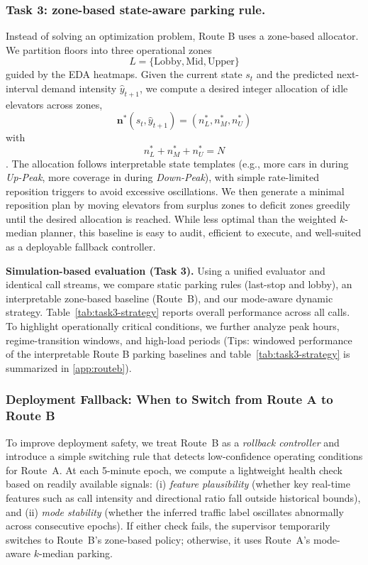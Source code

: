 \subsubsection{Task 3: zone-based state-aware parking rule.}\label{subsubsec:routebtask3}
Instead of solving an optimization problem, Route B uses a zone-based allocator. We partition floors into three operational zones
\[L=\{\text{Lobby},\text{Mid},\text{Upper}\}\] guided by the EDA heatmaps. Given the current state $s_t$ and the predicted next-interval
demand intensity $\hat y_{t+1}$, we compute a desired integer allocation of idle elevators across zones,
\[\mathbf{n}^{*}(s_t,\hat y_{t+1})=(n^{*}_{L},n^{*}_{M},n^{*}_{U})\] with \[n^{*}_{L}+n^{*}_{M}+n^{*}_{U}=N\]. The allocation follows
interpretable state templates (e.g., more cars in  during \emph{Up-Peak}, more coverage in  during \emph{Down-Peak}),
with simple rate-limited reposition triggers to avoid excessive oscillations. We then generate a minimal reposition plan by moving elevators
from surplus zones to deficit zones greedily until the desired allocation is reached. While less optimal than the weighted $k$-median planner,
this baseline is easy to audit, efficient to execute, and well-suited as a deployable fallback controller.


\noindent\textbf{Simulation-based evaluation (Task 3).}
Using a unified evaluator and identical call streams, we compare static parking rules
(last-stop and lobby), an interpretable zone-based baseline (Route~B),
and our mode-aware dynamic strategy.
Table~\ref{tab:task3-strategy} reports overall performance across all calls.
To highlight operationally critical conditions, we further analyze peak hours,
regime-transition windows, and high-load periods (Tips: windowed performance of the interpretable Route B parking baselines and table~\ref{tab:task3-strategy} is summarized in \ref{app:routeb}).

\subsubsection{Deployment Fallback: When to Switch from Route A to Route B}\label{subsubsec:switching}

To improve deployment safety, we treat Route~B as a \emph{rollback controller} and introduce a simple switching rule that detects
low-confidence operating conditions for Route~A. At each 5-minute epoch, we compute a lightweight health check based on readily available
signals: (i) \emph{feature plausibility} (whether key real-time features such as call intensity and directional ratio fall outside historical
bounds), and (ii) \emph{mode stability} (whether the inferred traffic label oscillates abnormally across consecutive epochs). If either check
fails, the supervisor temporarily switches to Route~B's zone-based policy; otherwise, it uses Route~A's mode-aware $k$-median parking.

